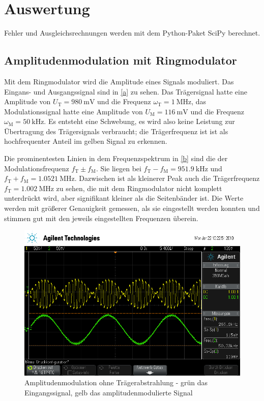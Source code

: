 \section{Auswertung}

Fehler und Ausgleichsrechnungen werden mit dem Python-Paket SciPy \cite{scipy} berechnet.

\subsection{Amplitudenmodulation mit Ringmodulator}

Mit dem Ringmodulator wird die Amplitude eines Signals moduliert. Das Eingans- und Ausgangssignal sind in \autoref{a} zu sehen. Das Trägersignal hatte eine Amplitude von $U_\text{T}=\SI{980}{\milli\volt}$ und die Frequenz $\omega_\text{T}=\SI{1}{\mega\hertz}$, das Modulationssignal hatte eine Amplitude von $U_\text{M}=\SI{116}{\milli\volt}$ und die Frequenz $\omega_\text{M}=\SI{50}{\kilo\hertz}$. Es entsteht eine Schwebung, es wird also keine Leistung zur Übertragung des Trägersignals verbraucht; die Trägerfrequenz ist ist als hochfrequenter Anteil im gelben Signal zu erkennen. \par
\indent Die prominentesten Linien in dem Frequenzspektrum in \autoref{b} sind die der Modulationsfrequenz $f_\text{T} \pm f_\text{M}$. Sie liegen bei $f_\text{T} - f_\text{M} = \SI{951.9}{\kilo\hertz}$ und $f_\text{T} + f_\text{M} = \SI{1.0521}{\mega\hertz}$. Dazwischen ist als kleinerer Peak auch die Trägerfrequenz $f_\text{T} = \SI{1.002}{\mega\hertz}$ zu sehen, die mit dem Ringmodulator nicht komplett unterdrückt wird, aber signifikant kleiner als die Seitenbänder ist. Die Werte werden mit größerer Genauigkeit gemessen, als sie eingestellt werden konnten und stimmen gut mit den jeweils eingestellten Frequenzen überein. \par

\begin{figure}
	\centering
	\includegraphics[width=\textwidth]{img/a_scope_230.png}
	\caption{Amplitudenmodulation ohne Trägerabstrahlung - grün das Eingangssignal, gelb das amplitudenmodulierte Signal}
	\label{a}
\end{figure}

